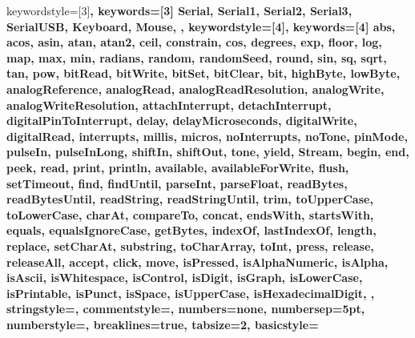 {  keywordstyle=[3]\bfseries\color{arduinoOrange},
  keywords=[3]{  %
                Serial, Serial1, Serial2, Serial3, SerialUSB, Keyboard, Mouse,
                },      
%
%
  keywordstyle=[4]\bfseries\color{arduinoOrange},
  keywords=[4]{  %
                abs, acos, asin, atan, atan2, ceil, constrain, cos, degrees, exp, 
                floor, log, map, max, min, radians, random, randomSeed, round, sin, 
                sq, sqrt, tan, pow, bitRead, bitWrite, bitSet, bitClear, bit, 
                highByte, lowByte, analogReference, analogRead, 
                analogReadResolution, analogWrite, analogWriteResolution, 
                attachInterrupt, detachInterrupt, digitalPinToInterrupt, delay, 
                delayMicroseconds, digitalWrite, digitalRead, interrupts, millis, 
                micros, noInterrupts, noTone, pinMode, pulseIn, pulseInLong, shiftIn, 
                shiftOut, tone, yield, Stream, begin, end, peek, read, print, 
                println, available, availableForWrite, flush, setTimeout, find, 
                findUntil, parseInt, parseFloat, readBytes, readBytesUntil, readString, 
                readStringUntil, trim, toUpperCase, toLowerCase, charAt, compareTo, 
                concat, endsWith, startsWith, equals, equalsIgnoreCase, getBytes, 
                indexOf, lastIndexOf, length, replace, setCharAt, substring, 
                toCharArray, toInt, press, release, releaseAll, accept, click, move, 
                isPressed, isAlphaNumeric, isAlpha, isAscii, isWhitespace, isControl, 
                isDigit, isGraph, isLowerCase, isPrintable, isPunct, isSpace, 
                isUpperCase, isHexadecimalDigit, 
                },      
%
%
  stringstyle=\bfseries\color{arduinoDarkBlue},    
  commentstyle=\color{arduinoGrey},    
%          
%   
  numbers=none,%
  numbersep=5pt,                   
  numberstyle=\color{arduinoGrey},    
%
%
  breaklines=true,                    %
  tabsize=2,
  basicstyle=\ttfamily  
}

